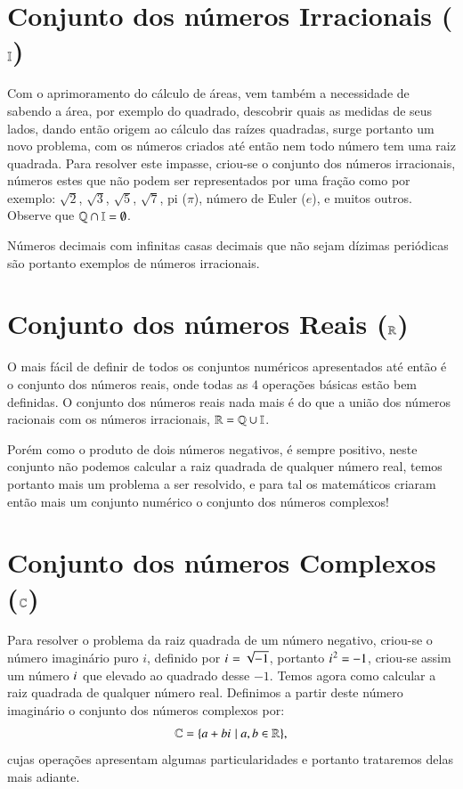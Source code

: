 \section{Conjunto dos números Irracionais (\texorpdfstring{$\mathbb{I}$}{I})}

Com o aprimoramento do cálculo de áreas, vem também a necessidade de sabendo a área, por exemplo do quadrado, descobrir quais as medidas de seus lados, dando então origem ao cálculo das raízes quadradas, surge portanto um novo problema, com os números criados até então nem todo número tem uma raiz quadrada. Para resolver este impasse, criou-se o conjunto dos números irracionais, números estes que não podem ser representados por uma fração como por exemplo: $\sqrt{2}$, $\sqrt{3}$, $\sqrt{5}$, $\sqrt{7}$, pi ($\pi$), número de Euler ($e$), e muitos outros. Observe que $\mathbb{Q} \cap \mathbb{I} = \emptyset$.

Números decimais com infinitas casas decimais que não sejam dízimas periódicas são portanto exemplos de números irracionais.

\section{Conjunto dos números Reais (\texorpdfstring{$\mathbb{R}$}{R})}

O mais fácil de definir de todos os conjuntos numéricos apresentados até então é o conjunto dos números reais, onde todas as 4 operações básicas estão bem definidas. O conjunto dos números reais nada mais é do que a união dos números racionais com os números irracionais, $\mathbb{R}= \mathbb{Q} \cup \mathbb{I}$.

Porém como o produto de dois números negativos, é sempre positivo, neste conjunto não podemos calcular a raiz quadrada de qualquer número real, temos portanto mais um problema a ser resolvido, e para tal os matemáticos criaram então mais um conjunto numérico o conjunto dos números complexos!


\section{Conjunto dos números Complexos (\texorpdfstring{$\mathbb{C}$}{C})}

Para resolver o problema da raiz quadrada de um número negativo, criou-se o número imaginário puro $i$, definido por ${i\mkern1mu}= \sqrt{-1}$, portanto ${i\mkern1mu}^2= -1$, criou-se assim um número ${i\mkern1mu}$ que elevado ao quadrado desse $-1$. Temos agora como calcular a raiz quadrada de qualquer número real. Definimos a partir deste número imaginário o conjunto dos números complexos por:
\[\mathbb{C}= \{a + b{i\mkern1mu} \mid a, b \in \mathbb{R} \} ,\]
cujas operações apresentam algumas particularidades e portanto trataremos delas mais adiante.

